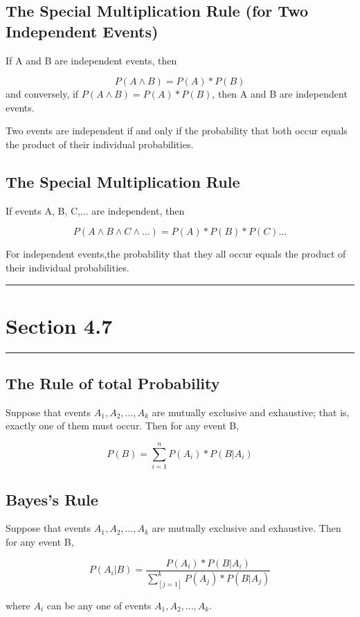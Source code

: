\documentclass[12pt]{article}
\begin{document}
        \subsection*{The Special Multiplication Rule (for Two Independent Events)}
            If A and B are independent events, then
            \begin{center}
                \[
                    P(A \wedge B) = P(A) * P(B)    
                \]
                and conversely, if $P(A \wedge B) = P(A) * P(B)$, then A and B are independent events. 
            \end{center}
            Two events are independent if and only if the probability that both occur equals the product
            of their individual probabilities.
        \subsection*{The Special Multiplication Rule}
            If events A, B, C,$\dots$ are independent, then
            \begin{center}
                \[
                    P(A \wedge B \wedge C \wedge \dots) = P(A) * P(B) * P(C) \dots     
                \]
            \end{center}
            For independent events,the probability that they all occur equals the product of their 
            individual probabilities.

    \noindent\rule{\textwidth}{0.4pt}
    \section*{Section 4.7}
    \noindent\rule{\textwidth}{0.4pt}
        \subsection*{The Rule of total Probability}
        Suppose that events $A_1, A_2,\dots, A_k$ are mutually exclusive and exhaustive; that is, 
        exactly one of them must occur. Then for any event B,
        \begin{center}
            \[
                P(B) = \sum_{i=1}^n P(A_i) * P(B|A_i)
            \]
        \end{center}
        \subsection*{Bayes's Rule}
            Suppose that events $A_1, A_2,..., A_k$ are mutually exclusive and exhaustive. Then for 
            any event B,
            \begin{center}
                \[
                    P(A_i|B) = \frac{P(A_i) * P(B|A_i)}{\sum_[j=1]^k P(A_j) * P(B|A_j)}    
                \]
            \end{center}
            where $A_i$ can be any one of events $A_1, A_2,\dots, A_k$.
            
\end{document}
